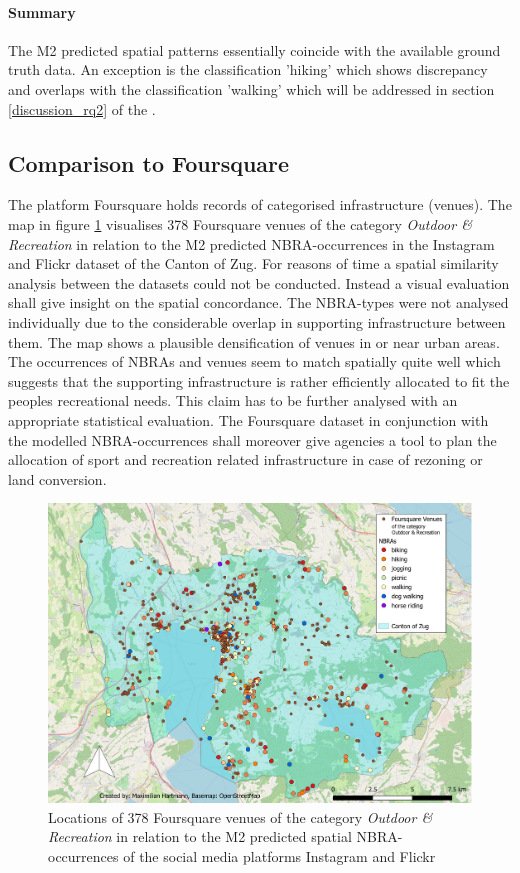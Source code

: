 \paragraph*{Summary}
The M2 predicted spatial patterns essentially coincide with the available ground truth data. An exception is the classification 'hiking' which shows discrepancy and overlaps with the classification 'walking' which will be addressed in section \ref{discussion_rq2} of the .

\subsection{Comparison to Foursquare}
The platform Foursquare holds records of categorised infrastructure (venues). The map in figure \ref{fig:map_foursquare_comparison} visualises 378 Foursquare venues of the category \textit{Outdoor \& Recreation} in relation to the M2 predicted NBRA-occurrences in the Instagram and Flickr dataset of the Canton of Zug. For reasons of time a spatial similarity analysis between the datasets could not be conducted. Instead a visual evaluation shall give insight on the spatial concordance. The NBRA-types were not analysed individually due to the considerable overlap in supporting infrastructure between them. The map shows a plausible densification of venues in or near urban areas. The occurrences of NBRAs and venues seem to match spatially quite well which suggests that the supporting infrastructure is rather efficiently allocated to fit the peoples recreational needs. This claim has to be further analysed with an appropriate statistical evaluation. The Foursquare dataset in conjunction with the modelled NBRA-occurrences shall moreover give agencies a tool to plan the allocation of sport and recreation related infrastructure in case of rezoning or land conversion.

\begin{figure}[h!]
   \centering
   \includegraphics[width=\textwidth,height=\textheight,keepaspectratio]{img/foursquare_comparison_cropped.pdf}
   \caption{Locations of 378 Foursquare venues of the category \textit{Outdoor \& Recreation} in relation to the M2 predicted spatial NBRA-occurrences of the social media platforms Instagram and Flickr}
   \label{fig:map_foursquare_comparison}
\end{figure}


